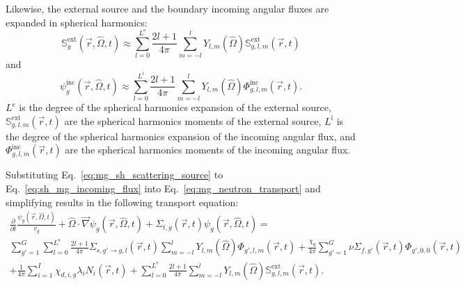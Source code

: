 Likewise, the external source and the boundary incoming angular fluxes are expanded in spherical harmonics:
\begin{equation}\label{eq:mg_sh_ext_source}
    \mathbb{S}^{\text{ext}}_{g}(\vec{r}, \hat{\Omega}, t) \approx \sum_{l = 0}^{L^{\text{e}}} \frac{2l + 1}{4\pi} \sum_{m = -l}^{l}Y_{l,m}(\hat{\Omega})\mathbb{S}^{\text{ext}}_{g,l,m}(\vec{r}, t)
\end{equation}
and
\begin{equation}\label{eq:sh_mg_incoming_flux}
    \psi^{\text{inc}}_{g}(\vec{r}, \hat{\Omega}, t) \approx \sum_{l = 0}^{L^{\text{i}}} \frac{2l + 1}{4\pi} \sum_{m = -l}^{l}Y_{l,m}(\hat{\Omega})\Phi^{\text{inc}}_{g,l,m}(\vec{r}, t)\text{.}
\end{equation}
$L^{\text{e}}$ is the degree of the spherical harmonics expansion of the external source, $\mathbb{S}^{\text{ext}}_{g,l,m}(\vec{r}, t)$ are the spherical harmonics moments of the external source, $L^{\text{i}}$ is the degree of the spherical harmonics expansion of the incoming angular flux, and $\Phi^{\text{inc}}_{g,l,m}(\vec{r}, t)$ are the spherical harmonics moments of the incoming angular flux. 

Substituting Eq.~\ref{eq:mg_sh_scattering_source} to Eq.~\ref{eq:sh_mg_incoming_flux} into Eq.~\ref{eq:mg_neutron_transport} and simplifying results in the following transport equation:
\begin{multline}\label{eq:mg_neutron_transport_pre_sn}
    \frac{\partial}{\partial t}\frac{\psi_{g}(\vec{r}, \hat{\Omega}, t)}{v_{g}} + \hat{\Omega}\cdot\vec{\nabla}\psi_{g}(\vec{r}, \hat{\Omega}, t) + \Sigma_{t,g}(\vec{r}, t)\psi_{g}(\vec{r}, \hat{\Omega}, t)
    = 
    \\\sum_{g' = 1}^{G}\sum_{l = 0}^{L^{\text{s}}}\frac{2l + 1}{4\pi}\Sigma_{s, g'\rightarrow g, l}(\vec{r}, t)\sum_{m = -l}^{l} Y_{l,m}(\hat{\Omega})\Phi_{g', l, m}(\vec{r}, t)
    + \frac{\chi_{g}}{4\pi}\sum_{g' = 1}^{G} \nu\Sigma_{f,g'}(\vec{r}, t)\Phi_{g',0,0}(\vec{r}, t)
    \\+ \frac{1}{4\pi}\sum_{i = 1}^{I} \chi_{d,i,g}\lambda_{i}N_{i}(\vec{r}, t) + \sum_{l = 0}^{L^{\text{e}}} \frac{2l + 1}{4\pi} \sum_{m = -l}^{l}Y_{l,m}(\hat{\Omega})\mathbb{S}^{\text{ext}}_{g,l,m}(\vec{r}, t)\text{.}
\end{multline}

